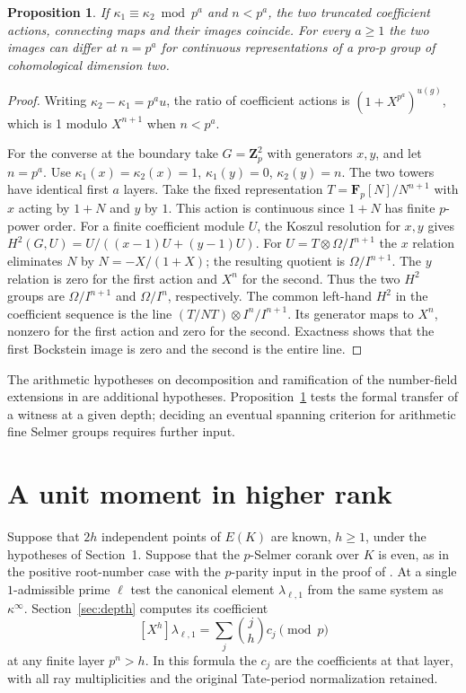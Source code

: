 \documentclass[11pt]{article}
\newtheorem{proposition}[theorem]{Proposition}
\newcommand{\Z}{\mathbf Z}
\newcommand{\F}{\mathbf F}
\begin{document}
\begin{proposition}\label{prop:bock-depth}
If $\kappa_1\equiv\kappa_2\bmod p^a$ and $n<p^a$, the two truncated
coefficient actions, connecting maps and their images coincide.
For every $a\ge1$ the two images can differ at $n=p^a$ for continuous
representations of a pro-$p$ group of cohomological dimension two.
\end{proposition}
\begin{proof}
Writing $\kappa_2-\kappa_1=p^a u$, the ratio of coefficient actions is
$(1+X^{p^a})^{u(g)}$, which is 1 modulo $X^{n+1}$ when $n<p^a$.

For the converse at the boundary take $G=\Z_p^2$ with generators
$x,y$, and let $n=p^a$. Use $\kappa_1(x)=\kappa_2(x)=1$,
$\kappa_1(y)=0$, $\kappa_2(y)=n$. The two towers have identical
first $a$ layers. Take the fixed representation
$T=\F_p[N]/N^{n+1}$ with $x$ acting by $1+N$ and $y$ by $1$.
This action is continuous since $1+N$ has finite $p$-power order.
For a finite coefficient module $U$, the Koszul resolution for $x,y$
gives $H^2(G,U)=U/((x-1)U+(y-1)U)$.
For $U=T\otimes\Omega/I^{n+1}$ the $x$ relation eliminates $N$ by
$N=-X/(1+X)$; the resulting quotient is $\Omega/I^{n+1}$.
The $y$ relation is zero for the first action and $X^n$ for the
second. Thus the two $H^2$ groups are $\Omega/I^{n+1}$ and
$\Omega/I^n$, respectively. The common left-hand $H^2$ in the
coefficient sequence is the line
$(T/NT)\otimes I^n/I^{n+1}$.
Its generator maps to $X^n$, nonzero for the first action and zero
for the second. Exactness shows that the first Bockstein image is
zero and the second is the entire line.
\end{proof}

The arithmetic hypotheses on decomposition and ramification of the
number-field extensions in \cite[Theorem 7.3]{RS} are additional
hypotheses. Proposition~\ref{prop:bock-depth} tests the formal transfer
of a witness at a given depth; deciding an eventual spanning criterion
for arithmetic fine Selmer groups requires further input.

\section{A unit moment in higher rank}

Suppose that $2h$ independent points of $E(K)$ are known, $h\ge1$,
under the hypotheses of Section~1. Suppose that the $p$-Selmer corank
over $K$ is even, as in the positive root-number case with the
$p$-parity input in the proof of \cite[Thm.~3.4]{FG}. At a single
$1$-admissible prime $\ell$ test the canonical element
$\lambda_{\ell,1}$ from the same system as $\kappa^\infty$.
Section~\ref{sec:depth} computes its coefficient
\[
             [X^h]\lambda_{\ell,1}
             =\sum_j\binom jh c_j\pmod p
\]
at any finite layer $p^n>h$. In this formula the $c_j$ are the
coefficients at that layer, with all ray multiplicities and the
original Tate-period normalization retained.
\end{document}
